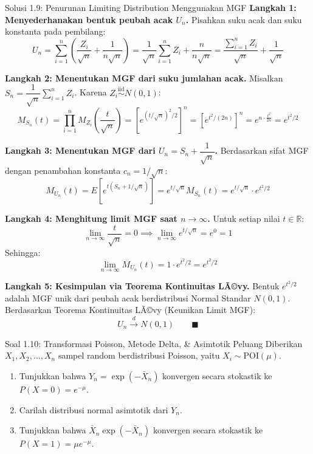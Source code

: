 \documentclass[10pt,twoside]{article}
\begin{document}
\begin{solbox}{Solusi 1.9: Penurunan Limiting Distribution Menggunakan MGF}
\textbf{Langkah 1: Menyederhanakan bentuk peubah acak $U_n$.}
Pisahkan suku acak dan suku konstanta pada pembilang:
\[
U_n = \sum_{i=1}^n \left(\frac{Z_i}{\sqrt{n}} + \frac{1}{n\sqrt{n}}\right) = \frac{1}{\sqrt{n}}\sum_{i=1}^n Z_i + \frac{n}{n\sqrt{n}} = \frac{\sum_{i=1}^n Z_i}{\sqrt{n}} + \frac{1}{\sqrt{n}}
\]

\textbf{Langkah 2: Menentukan MGF dari suku jumlahan acak.}
Misalkan $S_n = \dfrac{1}{\sqrt{n}}\sum_{i=1}^n Z_i$. Karena $Z_i \overset{\mathrm{iid}}{\sim} N(0, 1)$:
\[
M_{S_n}(t) = \prod_{i=1}^n M_{Z_i}\left(\frac{t}{\sqrt{n}}\right) = \left[e^{(t/\sqrt{n})^2 / 2}\right]^n = \left[e^{t^2 / (2n)}\right]^n = e^{n \cdot \frac{t^2}{2n}} = e^{t^2/2}
\]

\textbf{Langkah 3: Menentukan MGF dari $U_n = S_n + \dfrac{1}{\sqrt{n}}$.}
Berdasarkan sifat MGF dengan penambahan konstanta $c_n = 1/\sqrt{n}$:
\[
M_{U_n}(t) = E\left[e^{t(S_n + 1/\sqrt{n})}\right] = e^{t/\sqrt{n}} M_{S_n}(t) = e^{t/\sqrt{n}} \cdot e^{t^2/2}
\]

\textbf{Langkah 4: Menghitung limit MGF saat $n \to \infty$.}
Untuk setiap nilai $t \in \mathbb{R}$:
\[
\lim_{n \to \infty} \frac{t}{\sqrt{n}} = 0 \implies \lim_{n \to \infty} e^{t/\sqrt{n}} = e^0 = 1
\]
Sehingga:
\[
\lim_{n \to \infty} M_{U_n}(t) = 1 \cdot e^{t^2/2} = e^{t^2/2}
\]

\textbf{Langkah 5: Kesimpulan via Teorema Kontinuitas LÃ©vy.}
Bentuk $e^{t^2/2}$ adalah MGF unik dari peubah acak berdistribusi Normal Standar $N(0, 1)$. Berdasarkan Teorema Kontinuitas LÃ©vy (Keunikan Limit MGF):
\[
\boxed{U_n \xrightarrow{d} N(0, 1)} \qquad \blacksquare
\]
\end{solbox}

\begin{soalbox}{Soal 1.10: Transformasi Poisson, Metode Delta, \& Asimtotik Peluang}
Diberikan $X_1, X_2, \dots, X_n$ sampel random berdistribusi Poisson, yaitu $X_i \sim \text{POI}(\mu)$.
\begin{enumerate}[label=(\alph*)]
  \item Tunjukkan bahwa $Y_n = \exp(-\bar{X}_n)$ konvergen secara stokastik ke $P(X=0) = e^{-\mu}$.
  \item Carilah distribusi normal asimtotik dari $Y_n$.
  \item Tunjukkan bahwa $\bar{X}_n \exp(-\bar{X}_n)$ konvergen secara stokastik ke $P(X=1) = \mu e^{-\mu}$.
\end{enumerate}
\end{soalbox}
\end{document}
